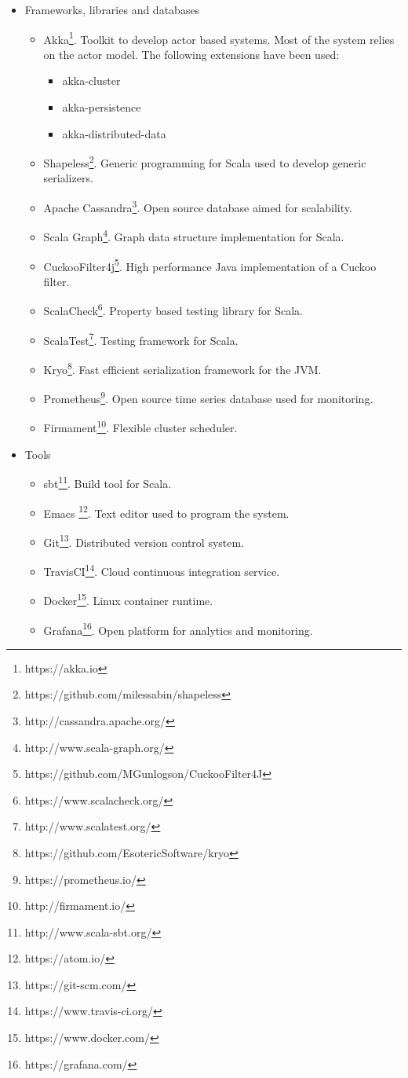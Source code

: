 \begin{itemize}
  \item Frameworks, libraries and databases
    \begin{itemize}
      \item Akka\footnote{https://akka.io}. Toolkit to develop actor based
        systems. Most of the system relies on the actor model. The following
        extensions have been used:
        \begin{itemize}
        \item akka-cluster
        \item akka-persistence
        \item akka-distributed-data
        \end{itemize}
      \item Shapeless\footnote{https://github.com/milessabin/shapeless}. Generic
        programming for Scala used to develop generic serializers.
      \item Apache Cassandra\footnote{http://cassandra.apache.org/}. Open source
        database aimed for scalability.
      \item Scala Graph\footnote{http://www.scala-graph.org/}. Graph data
        structure implementation for Scala.
      \item
        CuckooFilter4j\footnote{https://github.com/MGunlogson/CuckooFilter4J}.
        High performance Java implementation of a Cuckoo filter.
      \item ScalaCheck\footnote{https://www.scalacheck.org/}. Property based
        testing library for Scala.
      \item ScalaTest\footnote{http://www.scalatest.org/}. Testing framework for
        Scala.
      \item Kryo\footnote{https://github.com/EsotericSoftware/kryo}. Fast efficient serialization
        framework for the JVM.
      \item Prometheus\footnote{https://prometheus.io/}. Open
        source time series database used for monitoring.
      \item Firmament\footnote{http://firmament.io/}. Flexible cluster scheduler.
    \end{itemize}

  \item Tools
    \begin{itemize}
      \item sbt\footnote{http://www.scala-sbt.org/}. Build tool for Scala.
      \item Emacs \footnote{https://atom.io/}. Text editor used to program the system.
      \item Git\footnote{https://git-scm.com/}. Distributed version control system.
      \item TravisCI\footnote{https://www.travis-ci.org/}. Cloud continuous integration service.
      \item Docker\footnote{https://www.docker.com/}. Linux container runtime.
      \item Grafana\footnote{https://grafana.com/}. Open platform for analytics and monitoring.
    \end{itemize}

\end{itemize}
